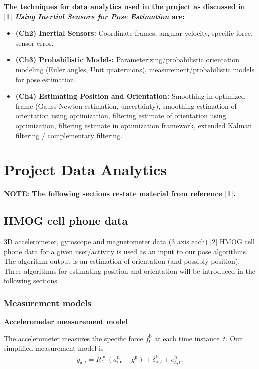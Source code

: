 \documentclass{article}
\begin{document}
\textbf{The techniques for data analytics used in the project as discussed
in [1] \textit{Using Inertial Sensors for Pose Estimation} are:}

\begin{itemize}
  \item \textbf{(Ch2) Inertial Sensors:} Coordinate frames, angular
    velocity, specific force, sensor error.
  \item \textbf{(Ch3) Probabilistic Models:} Parameterizing/probabilistic
    orientation modeling (Euler angles, Unit quaternions),
    measurement/probabilistic models for pose estimation.
  \item \textbf{(Ch4) Estimating Position and Orientation:} Smoothing
    in optimized frame (Gauss-Newton estimation, uncertainty),
    smoothing estimation of orientation using optimization, filtering
    estimate of orientation using optimization, filtering estimate in
    optimization framework, extended Kalman filtering / complementary
    filtering.
\end{itemize}

\section{Project Data Analytics}

\textbf{NOTE: The following sections restate material from reference [1].}

\subsection{HMOG cell phone data}

3D accelerometer, gyroscope and magnetometer data (3 axis each)  [2] HMOG cell phone data for a given user/activity
is used as an input to our pose algorithms. The algorithm output is an estimation of orientation (and possibly position).
Three algorithms for estimating position and orientation will be introduced in the following sections.

\subsubsection{Measurement models}

\textbf{Accelerometer measurement model}

The accelerometer measures the specific force $f^\text{b}_t$ at each time instance~$t$. Our simplified measurement model is
\begin{align}
\label{eq:models-accMeasModel}
y_{\text{a},t} 
= R^{\text{bn}}_t  ( a_{\text{nn}}^\text{n} - g^\text{n} )
+ \delta_{\text{a},t}^\text{b}
+ e_{\text{a},t}^\text{b}.
\end{align} 
\end{document}
